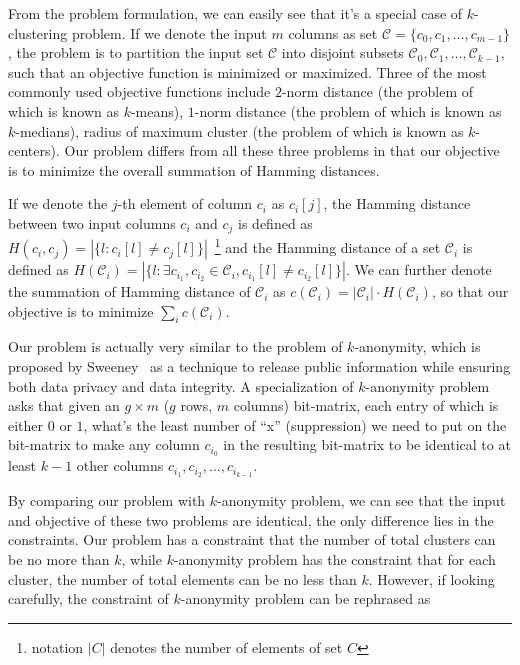 
From the problem formulation, we can easily see that it's a special
case of $k$-clustering problem. If we denote the input $m$ columns
as set $\mathcal{C} = \{c_0, c_1, \ldots, c_{m-1} \}$, the problem
is to partition the input set $\mathcal{C}$ into disjoint subsets
$\mathcal{C}_0, \mathcal{C}_1, \ldots, \mathcal{C}_{k-1}$, such that an
objective function is minimized or maximized. Three of the most commonly
used objective functions include $2$-norm distance (the problem of which
is known as $k$-means), $1$-norm distance (the problem of which is known
as $k$-medians), radius of maximum cluster (the problem of which is known
as $k$-centers). Our problem differs from all these three problems in that
our objective is to minimize the overall summation of {Hamming} distances.

If we denote the $j$-th element of column $c_i$ as $c_i[j]$, the {Hamming}
distance between two input columns $c_i$ and $c_j$ is defined as $H(c_i,
c_j) = |\{l: c_i[l] \neq c_j[l]\}|$~\footnote{notation $|C|$ denotes the 
number of elements of set $C$} and the {Hamming} distance of a
set $\mathcal{C}_i$ is defined as $H(\mathcal{C}_i) = |\{l: \exists
c_{i_1}, c_{i_2} \in \mathcal{C}_i, c_{i_1}[l] \neq c_{i_2}[l]\}|$. We
can further denote the summation of {Hamming} distance of $\mathcal{C}_i$
as $c(\mathcal{C}_i) = |\mathcal{C}_i| \cdot H(\mathcal{C}_i)$, so that
our objective is to minimize $\sum_i c(\mathcal{C}_i)$.

Our problem is actually very similar to the problem of $k$-anonymity,
which is proposed by Sweeney~\cite{Sweeney02} as a technique to release
public information while ensuring both data privacy and data integrity. A
specialization of $k$-anonymity problem asks that given an $g \times m$
($g$ rows, $m$ columns) bit-matrix, each entry of which is either $0$
or $1$, what's the least number of ``x'' (suppression) we need to put on
the bit-matrix to make any column $c_{i_0}$ in the resulting bit-matrix
to be identical to at least $k-1$ other columns $c_{i_1}, c_{i_2},
\ldots, c_{i_{k-1}}$.

By comparing our problem with $k$-anonymity problem, we can see that
the input and objective of these two problems are identical, the only
difference lies in the constraints. Our problem has a constraint that the
number of total clusters can be no more than $k$, while $k$-anonymity
problem has the constraint that for each cluster, the number of total
elements can be no less than $k$. However, if looking carefully, the
constraint of $k$-anonymity problem can be rephrased as

